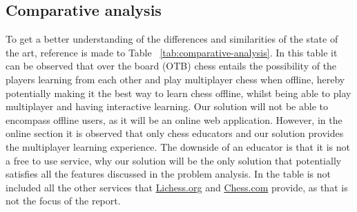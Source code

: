 \subsection{Comparative analysis}\label{subsec:comparative-analysis}

To get a better understanding of the differences and similarities of the state of the art, reference is made to Table
~\ref{tab:comparative-analysis}.
In this table it can be observed that over the board (OTB) chess entails the possibility of the players learning from
each other and play multiplayer chess when offline, hereby potentially making it the best way to learn chess offline,
whilst being able to play multiplayer and having interactive learning.
Our solution will not be able to encompass offline users, as it will be an online web application.
However, in the online section it is observed that only chess educators and our solution provides the multiplayer
learning experience.
The downside of an educator is that it is not a free to use service, why our solution will be the only solution that
potentially satisfies all the features discussed in the problem analysis.
In the table is not included all the other services that \url{Lichess.org} and \url{Chess.com} provide, as that is not
the focus of the report.


